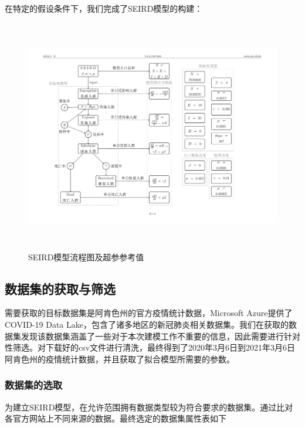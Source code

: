 \documentclass[withoutpreface,bwprint]{cumcmthesis} %
\begin{document}
在特定的假设条件下，我们完成了SEIRD模型的构建：

\clearpage
\begin{figure}[!htp]
    \centerline{\includegraphics[width=13.596cm,height=10.2cm]{figures/modlingfig_1.pdf}}
    \caption{SEIRD模型流程图及超参参考值}
\end{figure}

\vspace*{-1.2cm}
\subsection{数据集的获取与筛选}

需要获取的目标数据集是阿肯色州的官方疫情统计数据，Microsoft Azure提供了COVID-19 Data Lake，包含了诸多地区的新冠肺炎相关数据集。我们在获取的数据集发现该数据集涵盖了一些对于本次建模工作不重要的信息，因此需要进行针对性筛选。对下载好的csv文件进行清洗，最终得到了2020年3月6日到2021年3月6日阿肯色州的疫情统计数据，并且获取了拟合模型所需要的参数。

\vspace*{-0.5cm}

\subsubsection{数据集的选取}
为建立SEIRD模型，在允许范围拥有数据类型较为符合要求的数据集。通过比对各官方网站上不同来源的数据。最终选定的数据集属性表如下
\end{document}
